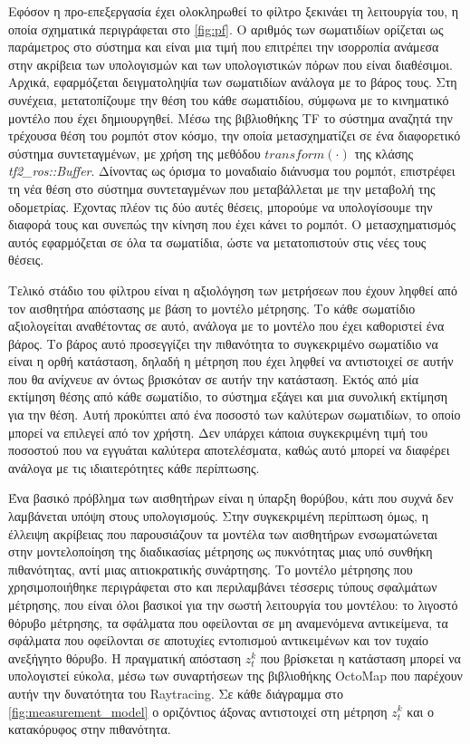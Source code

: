 Εφόσον η προ-επεξεργασία έχει ολοκληρωθεί το φίλτρο ξεκινάει τη λειτουργία του, η οποία σχηματικά περιγράφεται στο \autoref{fig:pf}. Ο αριθμός των σωματιδίων ορίζεται ως παράμετρος στο σύστημα και είναι μια τιμή που επιτρέπει την ισορροπία ανάμεσα στην ακρίβεια των υπολογισμών και των υπολογιστικών πόρων που είναι διαθέσιμοι. Αρχικά, εφαρμόζεται δειγματοληψία των σωματιδίων ανάλογα με το βάρος τους. Στη συνέχεια, μετατοπίζουμε την θέση του κάθε σωματιδίου, σύμφωνα με το κινηματικό μοντέλο που έχει δημιουργηθεί. Μέσω της βιβλιοθήκης TF το σύστημα αναζητά την τρέχουσα θέση του ρομπότ στον κόσμο, την οποία μετασχηματίζει σε ένα διαφορετικό σύστημα συντεταγμένων, με χρήση της μεθόδου $transform(\cdot)$ της κλάσης \emph{tf2\_ros::Buffer}. Δίνοντας ως όρισμα το μοναδιαίο διάνυσμα του ρομπότ, επιστρέφει τη νέα θέση στο σύστημα συντεταγμένων που μεταβάλλεται με την μεταβολή της οδομετρίας. Έχοντας πλέον τις δύο αυτές θέσεις, μπορούμε να υπολογίσουμε την διαφορά τους και συνεπώς την κίνηση που έχει κάνει το ρομπότ. Ο μετασχηματισμός αυτός εφαρμόζεται σε όλα τα σωματίδια, ώστε να μετατοπιστούν στις νέες τους θέσεις.

Τελικό στάδιο του φίλτρου είναι η αξιολόγηση των μετρήσεων που έχουν ληφθεί από τον αισθητήρα απόστασης με βάση το μοντέλο μέτρησης. Το κάθε σωματίδιο αξιολογείται αναθέτοντας σε αυτό, ανάλογα με το μοντέλο που έχει καθοριστεί ένα βάρος. Το βάρος αυτό προσεγγίζει την πιθανότητα το συγκεκριμένο σωματίδιο να είναι η ορθή κατάσταση, δηλαδή η μέτρηση που έχει ληφθεί να αντιστοιχεί σε αυτήν που θα ανίχνευε αν όντως βρισκόταν σε αυτήν την κατάσταση. Εκτός από μία εκτίμηση θέσης από κάθε σωματίδιο, το σύστημα εξάγει και μια συνολική εκτίμηση για την θέση. Αυτή προκύπτει από ένα ποσοστό των καλύτερων σωματιδίων, το οποίο μπορεί να επιλεγεί από τον χρήστη. Δεν υπάρχει κάποια συγκεκριμένη τιμή του ποσοστού που να εγγυάται καλύτερα αποτελέσματα, καθώς αυτό μπορεί να διαφέρει ανάλογα με τις ιδιαιτερότητες κάθε περίπτωσης.

Ένα βασικό πρόβλημα των αισθητήρων είναι η ύπαρξη θορύβου, κάτι που συχνά δεν λαμβάνεται υπόψη στους υπολογισμούς. Στην συγκεκριμένη περίπτωση όμως, η έλλειψη ακρίβειας που παρουσιάζουν τα μοντέλα των αισθητήρων ενσωματώνεται στην μοντελοποίηση της διαδικασίας μέτρησης ως πυκνότητας μιας υπό συνθήκη πιθανότητας, αντί μιας αιτιοκρατικής συνάρτησης. Το μοντέλο μέτρησης που χρησιμοποιήθηκε περιγράφεται στο \cite{thrun2005} και περιλαμβάνει τέσσερις τύπους σφαλμάτων μέτρησης, που είναι όλοι βασικοί για την σωστή λειτουργία του μοντέλου: το λιγοστό θόρυβο μέτρησης, τα σφάλματα που οφείλονται σε μη αναμενόμενα αντικείμενα, τα σφάλματα που οφείλονται σε αποτυχίες εντοπισμού αντικειμένων και τον τυχαίο ανεξήγητο θόρυβο. Η πραγματική απόσταση $z_t^k$ που βρίσκεται η κατάσταση μπορεί να υπολογιστεί εύκολα, μέσω των συναρτήσεων της βιβλιοθήκης OctoMap που παρέχουν αυτήν την δυνατότητα του Raytracing. Σε κάθε διάγραμμα στο \autoref{fig:measurement_model} ο οριζόντιος άξονας αντιστοιχεί στη μέτρηση $z_t^k$ και ο κατακόρυφος στην πιθανότητα. 

